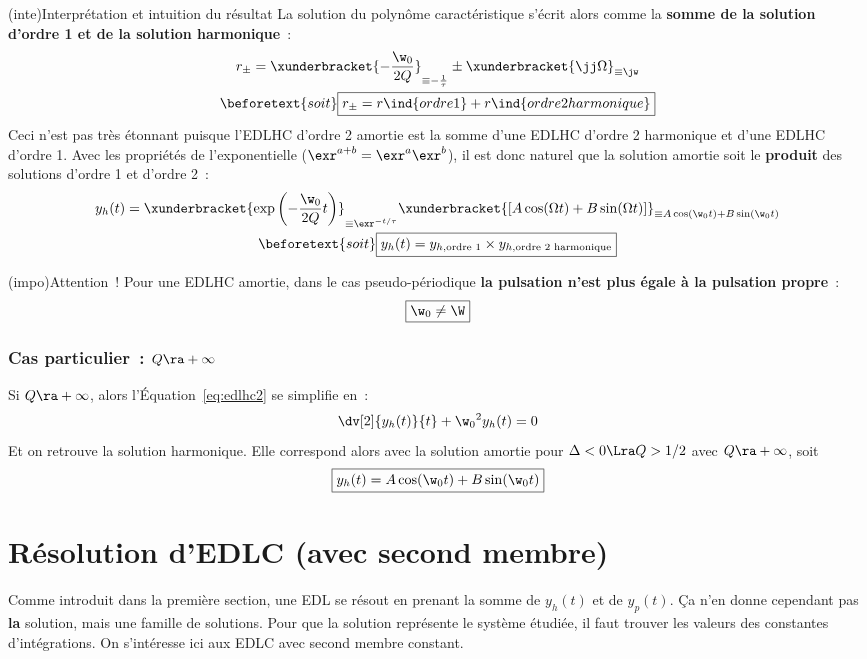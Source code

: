 \documentclass[a4paper, 11pt, garamond]{book}
\begin{document}
\begin{tcn}[breakable](inte){Interprétation et intuition du résultat}
  La solution du polynôme caractéristique s'écrit alors comme la \textbf{somme
  de la solution d'ordre 1 et de la solution harmonique}~:
  \begin{gather*}
		r_{\pm} =
		\xunderbracket{-\frac{\w_0}{2Q}}_{\equiv -\frac{1}{\tau}}
    \pm
    \xunderbracket{\jj \Omega}_{\equiv \jw}
    \\
    \beforetext{soit}
    \boxed{r_{\pm} = r\ind{ordre 1} + r\ind{ordre 2 harmonique}}
  \end{gather*}
  Ceci n'est pas très étonnant puisque l'EDLHC d'ordre 2 amortie est la somme
  d'une EDLHC d'ordre 2 harmonique et d'une EDLHC d'ordre 1.
  \tcblower
  Avec les propriétés de l'exponentielle ($\exr^{a+b} = \exr^{a}\exr^{b}$), il
  est donc naturel que la solution amortie soit le \textbf{produit} des
  solutions d'ordre 1 et d'ordre 2~:
	\begin{gather*}
			y_h(t) =
      \xunderbracket{\exp\left( -\frac{\w_0}{2Q}t \right)}_{\equiv
      \exr^{-t/\tau}}
			\xunderbracket{%
        \left[A\cos(\Omega t) + B\sin(\Omega t)\right]%
      }_{\equiv A\cos(\w_0t) + B\sin(\w_0t)}
		\\
    \beforetext{soit}
    \boxed{%
      y_h(t) = y_{h, \text{ordre 1}} \times y_{h, \text{ordre 2 harmonique}}
    }
	\end{gather*}
\end{tcn}

\begin{tcn}(impo){Attention~!}
  Pour une EDLHC amortie, dans le cas pseudo-périodique \textbf{la pulsation
  n'est plus égale à la pulsation propre}~:
  \[
    \boxed{\w_0 \neq \W}
  \]
\end{tcn}

\subsubsection{Cas particulier~: $Q \ra +\infty$}
Si $Q \ra +\infty$, alors l'Équation~\eqref{eq:edlhc2} se simplifie en~:
\[
	\dv[2]{y_h(t)}{t} + \w_0{}^{2}y_h(t) = 0
\]
Et on retrouve la solution harmonique. Elle correspond alors avec la solution
amortie pour $\Delta < 0 \Lra Q>1/2$ avec $Q \ra +\infty$, soit
\[
	\boxed{y_h(t) = A \cos(\w_0t) + B\sin(\w_0t)}
\]

\section{Résolution d'EDLC (avec second membre)}
Comme introduit dans la première section, une EDL se résout en prenant la somme
de $y_h(t)$ et de $y_p(t)$. Ça n'en donne cependant pas \textbf{la} solution,
mais une famille de solutions. Pour que la solution représente le système
étudiée, il faut trouver les valeurs des constantes d'intégrations. On
s'intéresse ici aux EDLC avec second membre constant.
\end{document}
